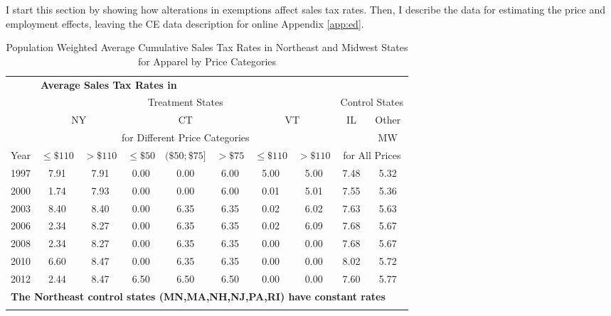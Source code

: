 \documentclass[12pt]{article}
\begin{document}
	I start this section by showing how alterations in exemptions affect sales tax rates. Then, I describe the data for estimating the price and employment effects, leaving the CE data description for online Appendix \ref{app:ed}. 
	
		 			\begin{table}
		 				\caption{Population Weighted Average Cumulative Sales Tax Rates in Northeast and Midwest States for Apparel by Price Categories}
		 				\label{tab:salestax}
		 				\centering
		 				\begin{threeparttable}	
		 					\begin{tabular}{lccccccccc}
		 						\toprule
		 						& \multicolumn{9}{l}{\textbf{Average Sales Tax Rates in}}  \\
		 						& \multicolumn{7}{c}{Treatment States} & \multicolumn{2}{c}{Control States} \\ 
		 						\cmidrule(r){2-8} \cmidrule(r){9-10}
		 						& \multicolumn{2}{c}{NY} & \multicolumn{3}{c}{CT} & \multicolumn{2}{c}{VT} & IL & Other   \\
		 						\cmidrule(r){2-3} \cmidrule(r){4-6} \cmidrule(r){7-8}
		 						& \multicolumn{7}{c}{for Different Price Categories} & & MW \\
		 						\cmidrule(r){9-9} \cmidrule(r){10-10}
		 						Year & $\le\$110$ & $>\$110$ & $\le\$50$ & $(\$50;\$75]$ & $>\$75$ & $\le\$110$ & $>\$110$ & \multicolumn{2}{c}{for All Prices} \\
		 						\midrule
		 						1997 & 7.91 & 7.91 & 0.00 & 0.00 & 6.00 & 5.00 & 5.00 & 7.48 & 5.32\\
		 						2000 & 1.74 & 7.93 & 0.00 & 0.00 & 6.00 & 0.01 & 5.01 & 7.55 & 5.36\\
		 						2003 & 8.40 & 8.40 & 0.00 & 6.35 & 6.35 & 0.02 & 6.02 & 7.63 & 5.63\\
		 						2006 & 2.34 & 8.27 & 0.00 & 6.35 & 6.35 & 0.02 & 6.09 & 7.68 & 5.67\\
		 						2008 & 2.34 & 8.27 & 0.00 & 6.35 & 6.35 & 0.00 & 0.00 & 7.68 & 5.67\\
		 						2010 & 6.60 & 8.47 & 0.00 & 6.35 & 6.35 & 0.00 & 0.00 & 8.02 & 5.72\\
		 						2012 & 2.44 & 8.47 & 6.50 & 6.50 & 6.50 & 0.00 & 0.00 & 7.60 & 5.77\\
		 						\multicolumn{10}{l}{\textbf{The Northeast control states (MN,MA,NH,NJ,PA,RI) have constant rates}}\\ \noalign{\smallskip}\hline	 
		 					\end{tabular}

\end{threeparttable}
\end{table}
\end{document}
